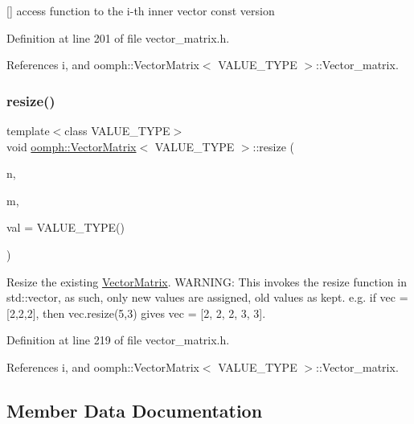 \mbox{[}\mbox{]} access function to the i-\/th inner vector const version 



Definition at line 201 of file vector\+\_\+matrix.\+h.



References i, and oomph\+::\+Vector\+Matrix$<$ V\+A\+L\+U\+E\+\_\+\+T\+Y\+P\+E $>$\+::\+Vector\+\_\+matrix.

\mbox{\label{classoomph_1_1VectorMatrix_a8e7bc2b06afb92f161e35f1a180c2320}} 
\subsubsection{\texorpdfstring{resize()}{resize()}}
{\footnotesize\ttfamily template$<$class V\+A\+L\+U\+E\+\_\+\+T\+Y\+PE$>$ \\
void \hyperlink{classoomph_1_1VectorMatrix}{oomph\+::\+Vector\+Matrix}$<$ V\+A\+L\+U\+E\+\_\+\+T\+Y\+PE $>$\+::resize (\begin{DoxyParamCaption}\item[{const size\+\_\+t \&}]{n,  }\item[{const size\+\_\+t \&}]{m,  }\item[{V\+A\+L\+U\+E\+\_\+\+T\+Y\+PE}]{val = {\ttfamily VALUE\+\_\+TYPE()} }\end{DoxyParamCaption})\hspace{0.3cm}{\ttfamily [inline]}}



Resize the existing \hyperlink{classoomph_1_1VectorMatrix}{Vector\+Matrix}. W\+A\+R\+N\+I\+NG\+: This invokes the resize function in std\+::vector, as such, only new values are assigned, old values as kept. e.\+g. if vec = \mbox{[}2,2,2\mbox{]}, then vec.\+resize(5,3) gives vec = \mbox{[}2, 2, 2, 3, 3\mbox{]}. 



Definition at line 219 of file vector\+\_\+matrix.\+h.



References i, and oomph\+::\+Vector\+Matrix$<$ V\+A\+L\+U\+E\+\_\+\+T\+Y\+P\+E $>$\+::\+Vector\+\_\+matrix.



\subsection{Member Data Documentation}
\mbox{\label{classoomph_1_1VectorMatrix_a3c91bd42a753ee7e82b9ba72f3288226}} 
